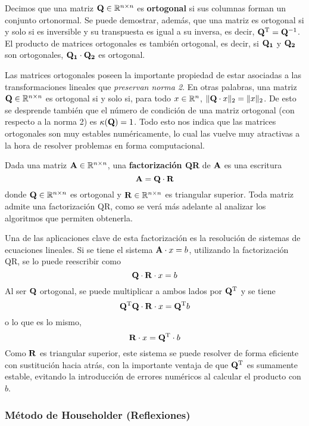 Decimos que una matriz $\mathbf{Q} \in \mathbb{R}^{n \times n}$ es \textbf{ortogonal}
si sus columnas forman un conjunto ortonormal. Se puede demostrar, además, que
una matriz es ortogonal si y solo si es inversible y su transpuesta es igual a
su inversa, es decir, $\mathbf{Q}^{\mathrm{T}} = \mathbf{Q}^{-1}$. El producto de matrices
ortogonales es también ortogonal, es decir, si $\mathbf{Q_1}$ y $\mathbf{Q_2}$ son
ortogonales, $\mathbf{Q_1} \cdot \mathbf{Q_2}$ es ortogonal.

Las matrices ortogonales poseen la importante propiedad de estar asociadas a
las
transformaciones lineales que \emph{preservan norma 2}. En otras palabras, una
matriz $\mathbf{Q} \in \mathbb{R}^{n \times n}$ es ortogonal si y solo si, para todo
$x \in \mathbb{R}^n$, $\lVert \mathbf{Q} \cdot x \rVert_2 = \lVert x \rVert_2$.
De esto se desprende también que el número de condición de una matriz
ortogonal (con respecto a la norma 2) es $\kappa(\mathbf{Q}) = 1$. Todo esto nos
indica que las matrices ortogonales son muy estables numéricamente, lo cual
las vuelve muy atractivas a la hora de resolver problemas en forma
computacional.


Dada una matriz $\mathbf{A} \in \mathbb{R}^{n \times n}$, una \textbf{factorización QR} de $\mathbf{A}$ es una escritura
\[ \mathbf{A} = \mathbf{Q} \cdot \mathbf{R} \]
donde $\mathbf{Q} \in \mathbb{R}^{n \times n}$ es ortogonal y
$\mathbf{R} \in \mathbb{R}^{n \times n}$ es triangular superior. Toda matriz admite
una factorización QR, como se verá más adelante al analizar los algoritmos
que permiten obtenerla.

Una de las aplicaciones clave de esta factorización es la resolución
de sistemas de ecuaciones lineales. Si se tiene el sistema $\mathbf{A} \cdot x =
b$, utilizando la factorización QR, se lo puede reescribir como
\[\mathbf{Q} \cdot \mathbf{R} \cdot x = b\]
Al ser $\mathbf{Q}$ ortogonal, se puede multiplicar
a ambos lados por $\mathbf{Q}^{\mathrm{T}}$ y se tiene
\[\mathbf{Q}^{\mathrm{T}} \mathbf{Q} \cdot \mathbf{R} \cdot x = \mathbf{Q}^{\mathrm{T}} b\]
o lo que es lo mismo,
\[\mathbf{R} \cdot x = \mathbf{Q}^{\mathrm{T}} \cdot b\]
Como $\mathbf{R}$ es triangular superior, este sistema se puede resolver de forma
eficiente con sustitución hacia atrás, con la importante ventaja de que
$\mathbf{Q}^{\mathrm{T}}$ es sumamente estable, evitando la introducción de errores
numéricos al calcular el producto con $b$.

\subsubsection{Método de Householder (Reflexiones)}

